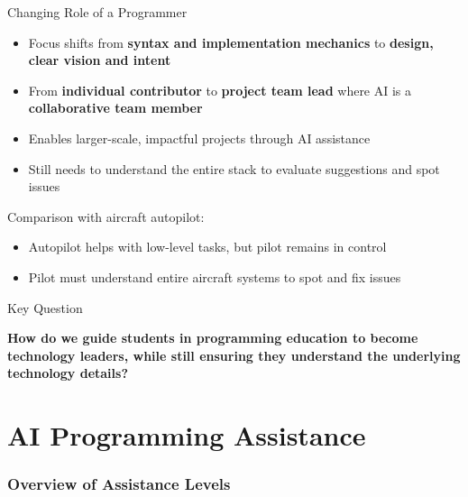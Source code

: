 \documentclass[xcolor={dvipsnames}, aspectratio=169]{beamer}
\begin{document}
\begin{frame}{Changing Role of a Programmer}
  \begin{itemize}
    \item Focus shifts from \textbf{syntax and implementation mechanics} to \textbf{design, clear vision and intent}
    \item From \textbf{individual contributor} to \textbf{project team lead} where AI is a \textbf{collaborative team member}
    \item Enables larger-scale, impactful projects through AI assistance
    \item Still needs to understand the entire stack to evaluate suggestions and spot issues
  \end{itemize}
  
  \begin{alertbox}
    Comparison with aircraft autopilot:
    \begin{itemize}
      \item Autopilot helps with low-level tasks, but pilot remains in control
      \item Pilot must understand entire aircraft systems to spot and fix issues
    \end{itemize}
  \end{alertbox}
\end{frame}

\begin{frame}{Key Question}
  \begin{center}
    \large\textbf{How do we guide students in programming education to become technology leaders, while still ensuring they understand the underlying technology details?}
  \end{center}
\end{frame}

\part[AI Programming Assistance]{AI Programming Assistance}
\section{Overview of Assistance Levels}
\end{document}
